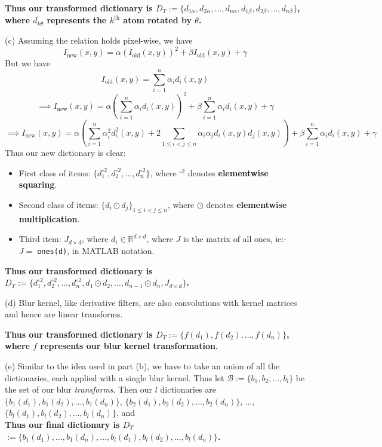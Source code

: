 \documentclass[a4paper,14pt]{article}
\numberwithin{definition}{section}
\numberwithin{mytheorem}{subsection}
\begin{document}
\textbf{Thus our transformed dictionary is $D_T := \{d_{1\alpha}, d_{2\alpha}, \hdots, d_{n\alpha}, d_{1\beta}, d_{2\beta}, \hdots, d_{n\beta}\}$, where $d_{k\theta}$ represents the $k^{\mathrm{th}}$ atom rotated by $\theta$.}

(c) Assuming the relation holds pixel-wise, we have
$$I_{\mathrm{new}}(x,y) = \alpha(I_{\mathrm{old}}(x,y))^2 + \beta I_{\mathrm{old}}(x,y) + \gamma$$
But we have
$$I_{\mathrm{old}}(x,y) = \sum^{n}_{i = 1}\alpha_id_i(x,y)$$
$$\implies I_{\mathrm{new}}(x,y) = \alpha(\sum_{i=1}^{n} \alpha_id_{i}(x,y))^2+\beta\sum_{i=1}^{n} \alpha_id_{i}(x,y)+\gamma $$
$$\implies I_{\mathrm{new}}(x,y) = \alpha(\sum_{i=1}^{n} \alpha_i^2d_{i}^2(x,y) + 2\sum_{1\leq i < j\leq n}\alpha_i\alpha_jd_{i}(x,y)d_{j}(x,y))+\beta\sum_{i=1}^{n} \alpha_id_{i}(x,y)+\gamma $$
Thus our new dictionary is clear:
\begin{itemize}
    \item First class of items: $\{d_1^{\circ 2}, d_2^{\circ 2}, ..., d_n^{\circ 2}\}$, where $^{\circ 2}$ denotes \textbf{elementwise squaring}.
    \item Second class of items: $\{d_i\odot d_j\}_{1\leq i < j\leq n}$, where $\odot$ denotes \textbf{elementwise multiplication}.
    \item Third item: $J_{d\times d}$, where $d_i\in\mathbb{R}^{d\times d}$, where $J$ is the matrix of all ones, ie:- $J = \;$\texttt{ones(d)}, in MATLAB notation.
\end{itemize}

\textbf{Thus our transformed dictionary is $D_T := \{d_1^{\circ 2}, d_2^{\circ 2}, ..., d_n^{\circ 2}, d_1\odot d_2,\hdots,d_{n-1}\odot d_{n},J_{d\times d}\}$.}

(d) Blur kernel, like derivative filters, are also convolutions with kernel matrices and hence are linear transforms.

\textbf{Thus our transformed dictionary is $D_T := \{f(d_1), f(d_2), \hdots, f(d_n)\}$, where $f$ represents our blur kernel transformation.}

(e) Similar to the idea used in part (b), we have to take an union of all the dictionaries, each applied with a single blur kernel. Thus let $\mathcal{B} := \{b_1, b_2, ..., b_l\}$ be the set of our blur \emph{transforms}. Then our $l$ dictionaries are $\{b_1(d_1), b_1(d_2), \hdots, b_1(d_n)\}$, $\{b_2(d_1), b_2(d_2), \hdots, b_2(d_n)\}$, ..., $\{b_l(d_1), b_l(d_2), \hdots, b_l(d_n)\}$, and \\
\textbf{Thus our final dictionary is $D_T$
 $:= \{b_1(d_1), \hdots, b_1(d_n), \hdots, b_l(d_1), b_l(d_2), \hdots, b_l(d_n)\}$.}\\
\end{document}

